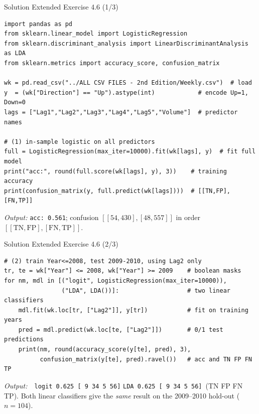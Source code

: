 \documentclass[aspectratio=169,11pt]{beamer}
\begin{document}
\begin{frame}[fragile]{Solution \textemdash{} Extended Exercise 4.6 (1/3)}
\begin{solutionbox}
\begin{lstlisting}
import pandas as pd
from sklearn.linear_model import LogisticRegression
from sklearn.discriminant_analysis import LinearDiscriminantAnalysis as LDA
from sklearn.metrics import accuracy_score, confusion_matrix

wk = pd.read_csv("../ALL CSV FILES - 2nd Edition/Weekly.csv")  # load
y  = (wk["Direction"] == "Up").astype(int)            # encode Up=1, Down=0
lags = ["Lag1","Lag2","Lag3","Lag4","Lag5","Volume"]  # predictor names

# (1) in-sample logistic on all predictors
full = LogisticRegression(max_iter=10000).fit(wk[lags], y)  # fit full model
print("acc:", round(full.score(wk[lags], y), 3))    # training accuracy
print(confusion_matrix(y, full.predict(wk[lags])))  # [[TN,FP],[FN,TP]]
\end{lstlisting}
\emph{Output:} \texttt{acc: 0.561}; confusion
$[[54,430],[48,557]]$ in order $[[\mathrm{TN},\mathrm{FP}],[\mathrm{FN},\mathrm{TP}]]$.
\end{solutionbox}
\end{frame}

\begin{frame}[fragile]{Solution \textemdash{} Extended Exercise 4.6 (2/3)}
\begin{solutionbox}
\begin{lstlisting}
# (2) train Year<=2008, test 2009-2010, using Lag2 only
tr, te = wk["Year"] <= 2008, wk["Year"] >= 2009    # boolean masks
for nm, mdl in [("logit", LogisticRegression(max_iter=10000)),
                ("LDA", LDA())]:                   # two linear classifiers
    mdl.fit(wk.loc[tr, ["Lag2"]], y[tr])           # fit on training years
    pred = mdl.predict(wk.loc[te, ["Lag2"]])       # 0/1 test predictions
    print(nm, round(accuracy_score(y[te], pred), 3),
          confusion_matrix(y[te], pred).ravel())   # acc and TN FP FN TP
\end{lstlisting}
\emph{Output:}\ \ \texttt{logit 0.625 [ 9 34 5 56]}\quad
\texttt{LDA 0.625 [ 9 34 5 56]}\ (TN FP FN TP). Both linear classifiers
give the \emph{same} result on the 2009--2010 hold-out ($n=104$).
\end{solutionbox}
\end{frame}
\end{document}
